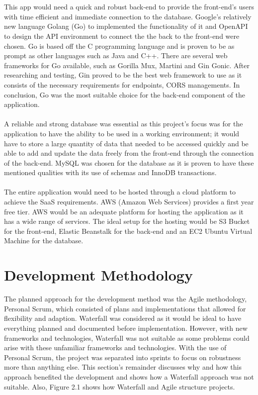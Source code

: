 \\\\ This app would need a quick and robust back-end to provide the front-end's users with time efficient and immediate connection to the database. Google's relatively new language Golang (Go) to implemented the functionality of it and OpenAPI to design the API environment to connect the the back to the front-end were chosen. Go is based off the C programming language and is proven to be as prompt as other languages such as Java and C++. There are several web frameworks for Go available, such as Gorilla Mux, Martini and Gin Gonic. After researching and testing, Gin proved to be the best web framework to use as it consists of the necessary requirements for endpoints, CORS managements. In conclusion, Go was the most suitable choice for the back-end component of the application.
\\\\ A reliable and strong database was essential as this project's focus was for the application to have the ability to be used in a working environment; it would have to store a large quantity of data that needed to be accessed quickly and be able to add and update the data freely from the front-end through the connection of the back-end. MySQL was chosen for the database as it is proven to have these mentioned qualities with its use of schemas and InnoDB transactions. 
\\\\ The entire application would need to be hosted through a cloud platform to achieve the SaaS requirements. AWS (Amazon Web Services) provides a first year free tier. AWS would be an adequate platform for hosting the application as it has a wide range of services. The ideal setup for the hosting would be S3 Bucket for the front-end, Elastic Beanstalk for the back-end and an EC2 Ubuntu Virtual Machine for the database.

\section{Development Methodology}
The planned approach for the development method was the Agile methodology, Personal Scrum, which consisted of plans and implementations that allowed for flexibility and adaption. Waterfall was considered as it would be ideal to have everything planned and documented before implementation. However, with new frameworks and technologies, Waterfall was not suitable as some problems could arise with these unfamiliar frameworks and technologies. With the use of Personal Scrum, the project was separated into sprints to focus on robustness more than anything else. This section's remainder discusses why and how this approach benefited the development and shows how a Waterfall approach was not suitable. Also, Figure 2.1 shows how Waterfall and Agile structure projects.

